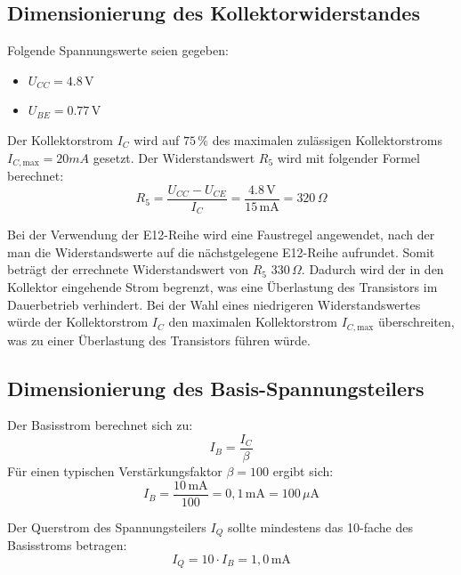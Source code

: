 \subsection{Dimensionierung des Kollektorwiderstandes}

 Folgende Spannungswerte seien gegeben:
 \begin{itemize}
     \item $U_{CC} = 4.8\,\mathrm{V}$
     \item $U_{BE} = 0.77\,\mathrm{V}$
 \end{itemize}

 Der Kollektorstrom $I_C$ wird auf $75\,\%$ des maximalen zulässigen Kollektorstroms \\$I_{C,\mathrm{max}} =20mA$  gesetzt. 
 Der Widerstandswert $R_5$ wird mit folgender Formel berechnet:
 \begin{equation}
     R_5 = \frac{U_{CC} - U_{CE}}{I_C} = \frac{4.8\,\mathrm{V}}{15\,\mathrm{mA}} = 320\,\Omega
 \end{equation}

 Bei der Verwendung der E12-Reihe wird eine Faustregel angewendet, nach der man die Widerstandswerte auf die nächstgelegene E12-Reihe aufrundet. 
 Somit beträgt der errechnete Widerstandswert von $R_5$ 330\,\(\Omega\). Dadurch wird der in den Kollektor eingehende Strom begrenzt, was eine Überlastung des Transistors im Dauerbetrieb verhindert. 
 Bei der Wahl eines niedrigeren Widerstandswertes würde der Kollektorstrom $I_C$ den maximalen Kollektorstrom $I_{C,\mathrm{max}}$ überschreiten, was zu einer Überlastung des Transistors führen würde.

\subsection{Dimensionierung des Basis-Spannungsteilers}
Der Basisstrom berechnet sich zu:
 \begin{equation}
     I_B = \frac{I_C}{\beta}
 \end{equation}
 Für einen typischen Verstärkungsfaktor $\beta = 100$ ergibt sich:
 \begin{equation}
     I_B = \frac{10\,\mathrm{mA}}{100} = 0{,}1\,\mathrm{mA} = 100\,\mu\mathrm{A}
 \end{equation}

 Der Querstrom des Spannungsteilers $I_Q$ sollte mindestens das 10-fache des Basisstroms betragen:
 \begin{equation}
     I_Q = 10 \cdot I_B = 1{,}0\,\mathrm{mA}
 \end{equation}

